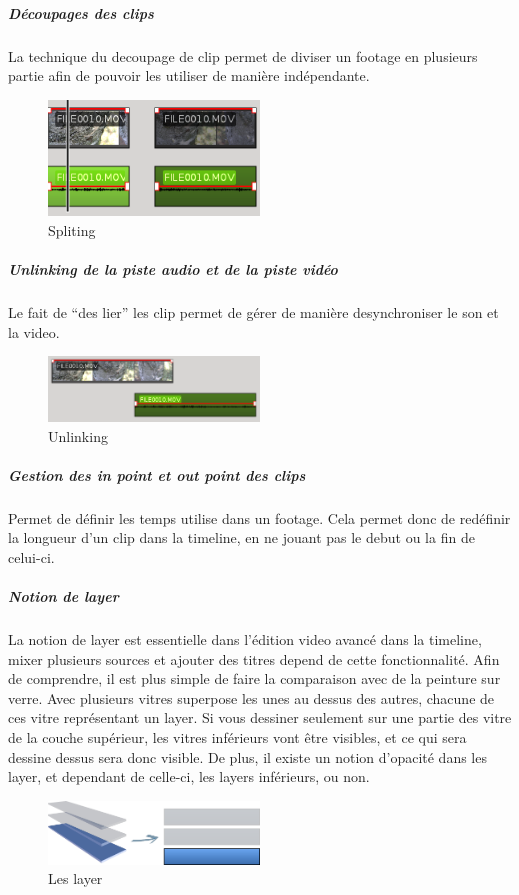\subparagraph{Découpages des clips}
  La technique du decoupage de clip permet de diviser un footage en plusieurs
  partie afin de pouvoir les utiliser de manière indépendante.
  \begin{figure}
    \begin{center}
      \includegraphics[width=0.5\textwidth]{images/splited}
    \end{center} \caption{Spliting} \label{Yes}
  \end{figure}

\subparagraph{Unlinking de la piste audio et de la piste vidéo}
  Le fait de ``des lier'' les clip permet de gérer de manière desynchroniser le son
  et la video.
  \begin{figure}
    \begin{center}
      \includegraphics[width=0.5\textwidth]{images/unlinked}
    \end{center} \caption{Unlinking} \label{Yes}
  \end{figure}

\subparagraph{Gestion des in point et  out point des clips} %
  Permet de définir les temps utilise dans un footage. Cela permet donc de
  redéfinir la longueur d'un clip dans la timeline, en ne jouant pas le debut
  ou la fin de celui-ci.

\subparagraph{Notion de layer}
  La notion de layer est essentielle dans l'édition video avancé dans la
  timeline, mixer plusieurs sources et ajouter des titres depend de cette
  fonctionnalité. Afin de comprendre, il est plus simple de faire la comparaison
  avec de la peinture sur verre. Avec plusieurs vitres superpose les unes au
  dessus des autres, chacune de ces vitre représentant un layer. Si vous
  dessiner seulement sur une partie des vitre de la couche supérieur, les vitres
  inférieurs vont être visibles, et ce qui sera dessine dessus sera donc visible.
  De plus, il existe un notion d'opacité dans les layer, et dependant de celle-ci,
  les layers inférieurs, ou non.
  \begin{figure}
    \begin{center}
      \includegraphics[width=0.5\textwidth]{images/layers}
    \end{center} \caption{Les layer} \label{Yes}
  \end{figure}

